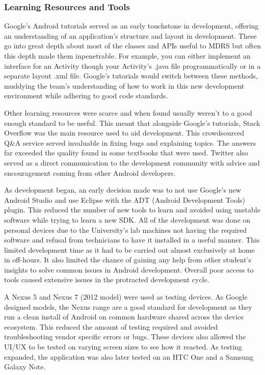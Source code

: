 \documentclass{l3proj}
\begin{document}
\subsubsection{Learning Resources and Tools} Google's Android tutorials served as an early touchstone in development, offering an understanding of an application's structure and layout in development. These go into great depth about most of the classes and APIs useful to MDRS but often this depth made them inpenetrable. For example, you can either implement an interface for an Activity though your Activity's .java file programmatically or in a separate layout .xml file. Google's tutorials would switch between these methods, muddying the team's understanding of how to work in this new development environment while adhering to good code standards.

Other learning resources were scarce and when found usually weren't to a good enough standard to be useful. This meant that alongside Google's tutorials, Stack Overflow was the main resource used to aid development. This crowdsourced Q&A service served invaluable in fixing bugs and explaining topics. The answers far exceeded the quality found in some textbooks that were used. Twitter also served as a direct communication to the development community with advice and encouragement coming from other Android developers.

As development began, an early decision made was to not use Google's new Android Studio and use Eclipse with the ADT (Android Development Tools) plugin. This reduced the number of new tools to learn and avoided using unstable software while trying to learn a new SDK. All of the development was done on personal devices due to the University's lab machines not having the required software and refusal from technicians to have it installed in a useful manner. This limited development time as it had to be carried out almost exclusively at home in off-hours. It also limited the chance of gaining any help from other student's insights to solve common issues in Android development. Overall poor access to tools caused extensive issues in the protracted  development cycle.

A Nexus 5 and Nexus 7 (2012 model) were used as testing devices. As Google designed models, the Nexus range are a good standard for development as they run a clean install of Android on common hardware shared across the device ecosystem. This reduced the amount of testing required and avoided troubleshooting vendor specific errors or bugs. These devices also allowed the UI/UX to be tested on varying screen sizes to see how it reacted. As testing expanded, the application was also later tested on an HTC One and a Samsung Galaxy Note.
\end{document}
